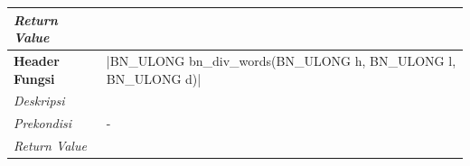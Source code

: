 \begin{table}[h]
\begin{tabular}{R{2.8cm}L{10.5cm}}
          \textit{Return Value}  &
          \\ \bottomrule
          \textbf{Header Fungsi} & |BN_ULONG bn_div_words(BN_ULONG h, BN_ULONG l, BN_ULONG d)|                        \\ \midrule
          \textit{Deskripsi}     &                                                                                    \\
          \textit{Prekondisi}    & -                                                                                  \\
          \textit{Return Value}  &
          \\ \bottomrule
        \end{tabular}

      \end{table}
